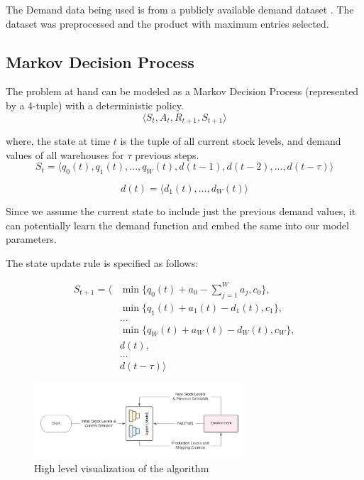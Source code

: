 \documentclass{article}
\begin{document}
The Demand data being used is from a publicly available demand dataset \cite{zhao_product_2017}. The dataset was preprocessed and the product with maximum entries selected. 

\pagebreak

\subsection{Markov Decision Process}

The problem at hand can be modeled as a Markov Decision Process (represented by a 4-tuple) with a deterministic policy.
\begin{equation}
    \langle S_t, A_t, R_{t+1}, S_{t+1} \rangle
\end{equation}


where, the state at time $t$ is the tuple of all current stock levels, and demand values of all warehouses for $\tau$ previous steps.
\begin{equation}
    S_t = \langle q_0(t), q_1(t), ..., q_W(t), d(t-1), d(t-2), ..., d(t-\tau) \rangle
\end{equation}

\begin{equation}
    d(t) = \langle d_1(t), ..., d_W(t) \rangle
\end{equation}

Since we assume the current state to include just the previous demand values, it can potentially learn the demand function and embed the same into our model parameters.

The state update rule is specified as follows:

\begin{equation}
    \begin{split}
        S_{t+1} = \langle & \min \{ q_0(t) + a_0 - \sum_{j = 1}^W a_j, c_0 \}, \\
        & \min \{ q_1(t) + a_1(t) - d_1(t), c_1 \}, \\
        & ... \\
        & \min \{ q_W(t) + a_W(t) - d_W(t), c_W \}, \\
        & d(t), \\
        & ... \\
        & d(t - \tau) \rangle
    \end{split}
\end{equation}




\begin{figure}[h]
    \centering
    \includegraphics[width=0.7\textwidth]{RL.png}
    \caption{High level visualization of the algorithm}
\end{figure}
\end{document}
